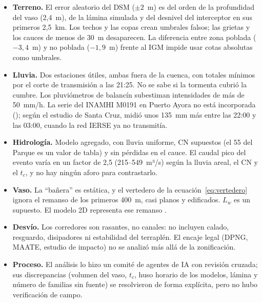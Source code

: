 \documentclass{sosg-informe}
\begin{document}
\begin{itemize}
  \item \textbf{Terreno.} El error aleatorio del DSM (${\pm}2$~m) es del orden de la profundidad del vaso (2,4~m), de la lámina simulada y del desnivel del interceptor en sus primeros 2,5~km. Los techos y las copas crean umbrales falsos; las grietas y los cauces de menos de 30~m desaparecen. La diferencia entre zona poblada ($-3,4$~m) y no poblada ($-1,9$~m) frente al IGM impide usar cotas absolutas como umbrales.
  \item \textbf{Lluvia.} Dos estaciones útiles, ambas fuera de la cuenca, con totales mínimos por el corte de transmisión a las 21:25. No se sabe si la tormenta cubrió la cumbre. Los pluviómetros de balancín subestiman intensidades de más de 50~mm/h. La serie del INAMHI M0191 en Puerto Ayora no está incorporada (); según el estudio de Santa Cruz, midió unos 135~mm más entre las 22:00 y las 03:00, cuando la red IERSE ya no transmitía.
  \item \textbf{Hidrología.} Modelo agregado, con lluvia uniforme, CN supuestos (el 55 del Parque es un valor de tabla) y sin pérdidas en el cauce. El caudal pico del evento varía en un factor de 2,5 (215--549~m³/s) según la lluvia areal, el CN y el $t_c$, y no hay ningún aforo para contrastarlo.
  \item \textbf{Vaso.} La \enquote{bañera} es estática, y el vertedero de la ecuación~\ref{eq:vertedero} ignora el remanso de los primeros 400~m, casi planos y edificados. $L_w$ es un supuesto. El modelo 2D representa ese remanso \citep{sosg202606}.
  \item \textbf{Desvío.} Los corredores son rasantes, no canales: no incluyen calado, resguardo, disipadores ni estabilidad del terraplén. El encaje legal (DPNG, MAATE, estudio de impacto) no se analizó más allá de la zonificación.
  \item \textbf{Proceso.} El análisis lo hizo un comité de agentes de IA con revisión cruzada; sus discrepancias (volumen del vaso, $t_c$, huso horario de los modelos, lámina y número de familias sin fuente) se resolvieron de forma explícita, pero no hubo verificación de campo.
\end{itemize}
\end{document}
